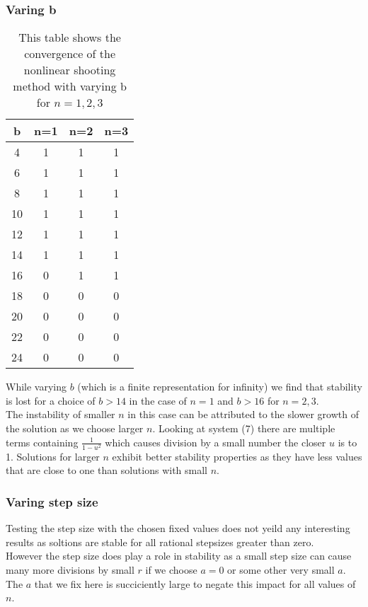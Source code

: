 \documentclass{article}
\begin{document}
\subsubsection{Varing b}
\begin{table}[H]
\centering
\begin{tabular}{|c|c|c|c|}
\hline
b & n=1 & n=2 & n=3   \\
\hline
4  & 1 & 1 & 1\\
6  & 1 & 1 & 1\\
8  & 1 & 1 & 1\\
10 & 1 & 1 & 1\\
12 & 1 & 1 & 1\\
14 & 1 & 1 & 1\\
16 & 0 & 1 & 1\\
18 & 0 & 0 & 0\\
20 & 0 & 0 & 0\\
22 & 0 & 0 & 0\\
24 & 0 & 0 & 0\\
\hline
\end{tabular}
\caption{This table shows the convergence of the nonlinear shooting method with varying b for $n=1,2,3$}
\end{table}
While varying $b$ (which is a finite representation for infinity) we find that stability is lost for a choice of $b > 14$ in the case of $n=1$ and $b>16$ for $n=2,3$. \\
The instability of smaller $n$ in this case can be attributed to the slower growth of the solution as we choose larger $n$. Looking at system (7) there are multiple terms containing $\frac{1}{1-u^2}$ which causes division by a small number the closer $u$ is to 1. Solutions for larger $n$ exhibit better stability properties as they have less values that are close to one than solutions with small $n$. 
\subsubsection{Varing step size}
Testing the step size with the chosen fixed values does not yeild any interesting results as soltions are stable for all rational stepsizes greater than zero. \\
However the step size does play a role in stability as a small step size can cause many more divisions by small $r$ if we choose $a=0$ or some other very small $a$. The $a$ that we fix here is succiciently large to negate this impact for all values of $n$. 
\end{document}
